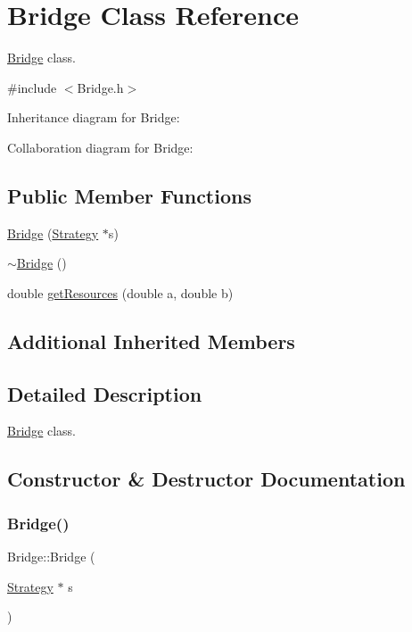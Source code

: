 \hypertarget{classBridge}{}\section{Bridge Class Reference}
\label{classBridge}


\hyperlink{classBridge}{Bridge} class.  




{\ttfamily \#include $<$Bridge.\+h$>$}



Inheritance diagram for Bridge\+:


Collaboration diagram for Bridge\+:
\subsection*{Public Member Functions}
\begin{DoxyCompactItemize}
\item 
\hyperlink{classBridge_a31994152fc209370604140c3591339c9}{Bridge} (\hyperlink{classStrategy}{Strategy} $\ast$s)
\item 
\hyperlink{classBridge_a812b325fbb4f4b589e68f11f443a7ee4}{$\sim$\+Bridge} ()
\item 
double \hyperlink{classBridge_a1508c1c9cfb44850fea31afcb7f1e403}{get\+Resources} (double a, double b)
\end{DoxyCompactItemize}
\subsection*{Additional Inherited Members}


\subsection{Detailed Description}
\hyperlink{classBridge}{Bridge} class. 

\subsection{Constructor \& Destructor Documentation}
\mbox{\label{classBridge_a31994152fc209370604140c3591339c9}} 
\subsubsection{\texorpdfstring{Bridge()}{Bridge()}}
{\footnotesize\ttfamily Bridge\+::\+Bridge (\begin{DoxyParamCaption}\item[{\hyperlink{classStrategy}{Strategy} $\ast$}]{s }\end{DoxyParamCaption})}

